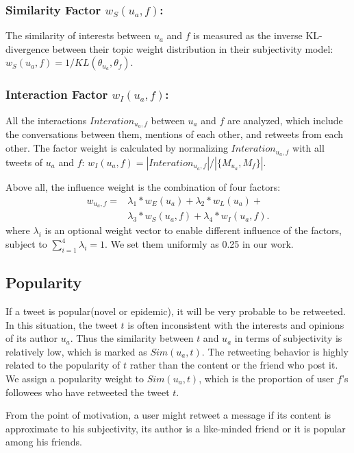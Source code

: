 \documentclass[letterpaper]{article}
\begin{document}
\subsubsection{Similarity Factor $ w_S(u_a,f) $:} The similarity of interests between $ u_a $ and $ f $ is measured as the inverse KL-divergence between their topic weight distribution in their subjectivity model: $ w_S(u_a,f)= 1/KL(\theta_{u_a},\theta_f)$.
\subsubsection{Interaction Factor $ w_I(u_a,f) $:} All the interactions $ Interation_{u_a,f} $ between $ u_a $ and $ f $ are analyzed, which include the conversations between them, mentions of each other, and retweets from each other. The factor weight is calculated by normalizing $Interation_{u_a,f}$ with all tweets of $ u_a $ and $ f $: $ w_I(u_a,f)=|Interation_{u_a,f}| /|\{ M_{u_a}, M_f \}| $.

Above all, the influence weight is the combination of four factors:
\begin{equation}
\begin{split}
w_{u_a,f}=& \lambda_1*w_E(u_a)+\lambda_2*w_L(u_a)+\\
   &\lambda_3*w_S(u_a,f)+\lambda_4*w_I(u_a,f). 
\end{split}
\end{equation}
where $ \lambda_i $ is an optional weight vector to enable different influence of the factors,  subject to $ \sum_{i=1}^{4}\lambda_i=1 $. We set them uniformly as 0.25 in our work.

\subsection{Popularity}

If a tweet is popular(novel or epidemic), it will be very probable to be retweeted. In this situation, the tweet $ t $ is often inconsistent with the interests and opinions of its author $ u_a $. Thus the similarity between $ t $ and $ u_a $ in terms of subjectivity is relatively low, which is marked as $ Sim(u_a,t) $. The retweeting behavior is highly related to the popularity of $ t $ rather than the content or the friend who post it. We assign a popularity weight to $ Sim(u_a,t) $, which is the proportion of user $ f $'s followees who have retweeted the tweet $ t $.

From the point of motivation, a user might retweet a message if its content is approximate to his subjectivity, its author is a like-minded friend or it is popular among his friends. 
\end{document}
